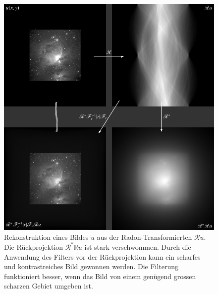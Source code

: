%
%
%
\begin{figure}
\centering
\includegraphics[width=\textwidth]{chapters/050-radon/images/orion2.pdf}
\caption{Rekonstruktion eines Bildes $u$ aus der Radon-Transformierten
$\mathscr{R}u$.
Die Rückprojektion $\mathscr{R}^*\mathbb{R}u$ ist stark verschwommen.
Durch die Anwendung des Filters vor der Rückprojektion kann ein
scharfes und kontrastreiches Bild gewonnen werden.
Die Filterung funktioniert besser, wenn das Bild von einem genügend 
grossen scharzen Gebiet umgeben ist.
\label{buch:radon:rueckprojektion:fig:rueckprojektion}}
\end{figure}
